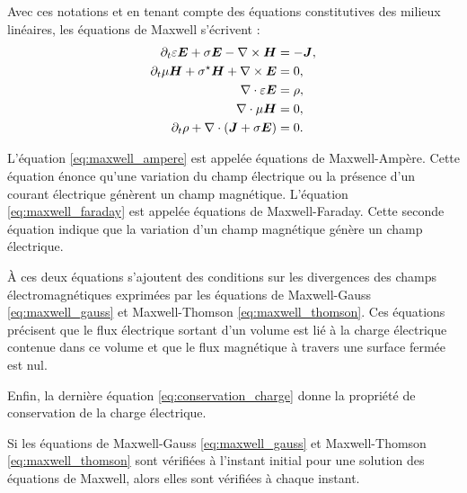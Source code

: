 Avec ces notations et en tenant compte des équations constitutives des milieux
linéaires, les équations de Maxwell s’écrivent :
\begin{subequations}
	\begin{align}
		\partial_{t} \varepsilon \bm{E} + \sigma \bm{E} - \nabla\times \bm{H} &= - \bm{J}
		\label{eq:maxwell_ampere} ,
		\\
		\partial_{t} \mu \bm{H} + \sigma^\star \bm{H} + \nabla\times \bm{E} &= 0
		\label{eq:maxwell_faraday} ,
		\\
		\nabla\cdot \varepsilon \bm{E} &= \rho
		\label{eq:maxwell_gauss} ,
		\\
		\nabla\cdot \mu \bm{H} &= 0
		\label{eq:maxwell_thomson} ,
		\\
		\partial_{t} \rho + \nabla\cdot (\bm{J} + \sigma \bm{E}) &= 0
		\label{eq:conservation_charge} .
	\end{align}
	\label{eq:maxwell}
\end{subequations}

L’équation \eqref{eq:maxwell_ampere} est appelée équations de Maxwell-Ampère.
Cette équation énonce qu'une variation du champ électrique ou la présence d'un
courant électrique génèrent un champ magnétique. L'équation \eqref{eq:maxwell_faraday}
est appelée équations de Maxwell-Faraday. Cette seconde équation indique que la
variation d'un champ magnétique génère un champ électrique.

À ces deux équations
s’ajoutent des conditions sur les divergences des champs électromagnétiques exprimées
par les équations de Maxwell-Gauss \eqref{eq:maxwell_gauss} et Maxwell-Thomson
\eqref{eq:maxwell_thomson}. Ces équations précisent que le flux électrique sortant
d'un volume est lié à la charge électrique contenue dans ce volume et que le flux
magnétique à travers une surface fermée est nul.

Enfin, la dernière équation \eqref{eq:conservation_charge} donne la propriété de
conservation de la charge électrique.
\\

\begin{proposition} \label{prop:divergence}
	\begin{sloppypar}
	Si les équations de Maxwell-Gauss \eqref{eq:maxwell_gauss} et Maxwell-Thomson
	\eqref{eq:maxwell_thomson} sont vérifiées à l'instant initial pour une solution des
	équations de Maxwell, alors elles sont vérifiées à chaque instant.
	\end{sloppypar}
\end{proposition}

